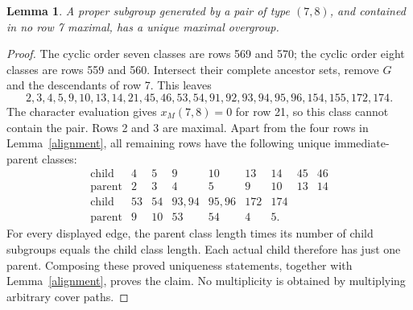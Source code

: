 \documentclass[11pt,a4paper]{article}
\newtheorem{lemma}{Lemma}\newtheorem{theorem}{Theorem}
\begin{document}
\begin{lemma}\label{unique}
A proper subgroup generated by a pair of type $(7,8)$, and contained
in no row 7 maximal, has a unique maximal overgroup.
\end{lemma}
\begin{proof}
The cyclic order seven classes are rows 569 and 570; the cyclic
order eight classes are rows 559 and 560. Intersect their complete
ancestor sets, remove $G$ and the descendants of row 7. This leaves
\[
2,3,4,5,9,10,13,14,21,45,46,53,54,91,92,93,94,95,96,154,155,172,174.
\]
The character evaluation gives $x_M(7,8)=0$ for row 21, so this
class cannot contain the pair. Rows 2 and 3 are maximal.
Apart from the four rows in Lemma~\ref{alignment}, all remaining
rows have the following unique immediate-parent classes:
\[
\begin{array}{c|rrrrrrrr}
\text{child}&4&5&9&10&13&14&45&46\\
\text{parent}&2&3&4&5&9&10&13&14\\\hline
\text{child}&53&54&93,94&95,96&172&174\\
\text{parent}&9&10&53&54&4&5.
\end{array}
\]
For every displayed edge, the parent class length times its number
of child subgroups equals the child class length. Each actual child
therefore has just one parent. Composing these proved uniqueness
statements, together with Lemma~\ref{alignment}, proves the claim.
No multiplicity is obtained by multiplying arbitrary cover paths.
\end{proof}
\end{document}
